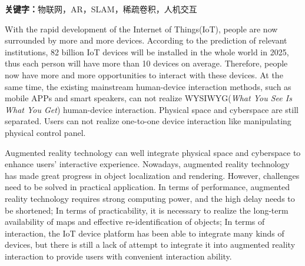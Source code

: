 \noindent\textbf{关键字：}物联网，AR，SLAM，稀疏卷积，人机交互

\cleardoublepage
{}
With the rapid development of the Internet of Things(IoT), people are now surrounded by more and more devices. According to the prediction of relevant institutions, 82 billion IoT devices will be installed in the whole world in 2025, thus each person will have more than 10 devices on average. Therefore, people now have more and more opportunities to interact with these devices. At the same time, the existing mainstream human-device interaction methods, such as mobile APPs and smart speakers, can not realize WYSIWYG(\textit{What You See Is What You Get}) human-device interaction. Physical space and cyberspace are still separated. Users can not realize one-to-one device interaction like manipulating physical control panel. 

Augmented reality technology can well integrate physical space and cyberspace to enhance users' interactive experience. Nowadays, augmented reality technology has made great progress in object localization and rendering. However, challenges need to be solved in practical application. In terms of performance, augmented reality technology requires strong computing power, and the high delay needs to be shortened; In terms of practicability, it is necessary to realize the long-term availability of maps and effective re-identification of objects; In terms of interaction, the IoT device platform has been able to integrate many kinds of devices, but there is still a lack of attempt to integrate it into augmented reality interaction to provide users with convenient interaction ability.

